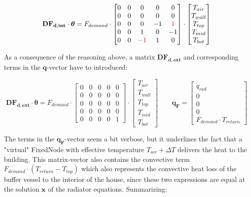 \begin{equation}
	\mathbf{DF_{d,int}} \cdot \boldsymbol{\theta} = 
	F_{demand} \cdot
	\begin{bmatrix}
		0 & 0 & 0 & 0 & 0 \\
		0 & 0 & 0 & 0 & 0 \\
		0 & 0 & 0 & -1 & \color{red}{1} \\
		0 & 0 & 1 & 0 & -1 \\
		0 & 0 & \color{red}{-1} & 1 & 0  
	\end{bmatrix}
	\cdot
	\begin{bmatrix}
		T_{air} \\
		T_{wall} \\
		T_{top} \\
		T_{mid} \\
		T_{bot}
	\end{bmatrix}
\end{equation}

As a consequence of the reasoning above, a matrix $\mathbf{DF_{d,ext}}$  and corresponding terms in the $\mathbf{\dot{q}}$-vector have to introduced:

\begin{equation}
	\mathbf{DF_{d, ext}} \cdot \boldsymbol{\theta} = 
	F_{demand} \cdot
	\begin{bmatrix}
		0 & 0 & 0 & 0 & 0 \\
		0 & 0 & 0 & 0 & 0 \\
		0 & 0 & 0 & 0 & 0 \\
		0 & 0 & 0 & 0 & 0 \\
		0 & 0 & 0 & 0 & 1  
	\end{bmatrix}
	\cdot
	\begin{bmatrix}
		T_{air} \\
		T_{wall} \\
		T_{top} \\
		T_{mid} \\
		T_{bot}
	\end{bmatrix}
    \qquad
    \mathbf{\dot{q_{F}}} = 
    \begin{bmatrix}
        \dot{q}_{rad} \\
    	0 \\
    	0 \\
    	0 \\
    	F_{demand} \cdot T_{return}  
    \end{bmatrix}
\end{equation}

The terms in the $\mathbf{\dot{q}_F}$-vector seem a bit verbose, but it underlines the fact that a "virtual" \textsf{FixedNode} with effective temperature $T_{air} + \Delta T$ delivers the heat to the building.
This matrix-vector also contains the convective term $F_{demand} \cdot (T_{return} - T_{top})$ which also represents the convective heat loss of the buffer vessel to the interior of the house, since these two expressions are equal at the solution $\mathbf{x}$ of the radiator equations. Summarizing:

